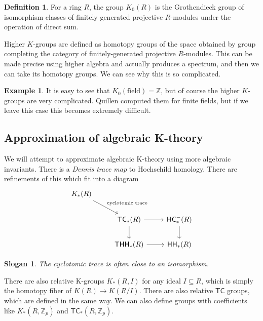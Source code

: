 \documentclass[10pt, oneside]{memoir}
\theoremstyle{definition}
\theoremstyle{remark}
\theoremstyle{plain}
\newtheorem*{slog*}{Slogan}
\theoremstyle{definition}
\newtheorem*{defn*}{Definition}
\newtheorem*{exm*}{Example}
\theoremstyle{remark}
\newcommand{\Z}{\mathbb{Z}}
\newcommand{\ms}[1]{\mathsf{#1}}
\newcommand{\1}{\mathbf{1}}
\newcommand{\2}{\mathbf{2}}
\newcommand{\3}{\mathbf{3}}
\newcommand{\HC}{\ms{HC}}
\newcommand{\THH}{\ms{THH}}
\newcommand{\TC}{\ms{TC}}
\newcommand{\HH}{\ms{HH}}
\begin{document}
\begin{defn*}
    For a ring \(R \), the group \(K_0(R) \) is the Grothendieck group of isomorphism classes of finitely generated projective \(R \)-modules under the operation of direct sum.
\end{defn*}

Higher \(K \)-groups are defined as homotopy groups of the space obtained by group completing the category of finitely-generated projective \(R \)-modules. This can be made precise using higher algebra and actually produces a spectrum, and then we can take its homotopy groups. We can see why this is so complicated. 

\begin{exm*}
    It is easy to see that \(K_0(\text{field}) = \Z \), but of course the higher \(K \)-groups are very complicated. Quillen computed them for finite fields, but if we leave this case this becomes extremely difficult. 
\end{exm*}

\subsection*{Approximation of algebraic K-theory}%
\label{sub:Approximation of algebraic K-theory}

We will attempt to approximate algebraic K-theory using more algebraic invariants. There is a \textit{Dennis trace map} to Hochschild homology. There are refinements of this which fit into a diagram
\begin{equation*}
\begin{tikzcd}
    K_*(R) \ar{dr}{\text{cyclotomic trace}} \\
    & \TC_*(R) \ar{r} \ar{d} & \HC_*^-(R) \ar{d} \\
    & \THH_*(R) \ar{r} & \HH_*(R)
\end{tikzcd}
\end{equation*}

\begin{slog*}
    The cyclotomic trace is often close to an isomorphism.
\end{slog*}

There are also relative K-groups \(K_*(R, I) \) for any ideal \(I \subseteq R \), which is simply the homotopy fiber of \(K(R) \to K(R/I) \). There are also relative \(\TC \) groups, which are defined in the same way. We can also define groups with coefficients like \(K_*(R, \Z_p) \) and \(\TC_*(R, \Z_p) \). 
\end{document}
